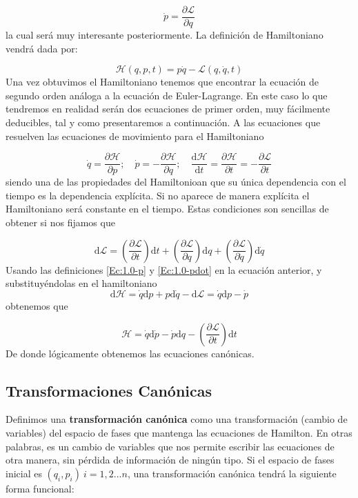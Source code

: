 \documentclass[12pt,a4paper]{article}
\numberwithin{equation}{section}
\numberwithin{figure}{section}
\newcommand{\parentesis}[1]{\left( #1  \right)}
\newcommand{\parciales}[2]{\frac{\partial #1}{\partial #2}}
\newcommand{\pparciales}[2]{\parentesis{\parciales{#1}{#2}}}
\newcommand{\D}{\mathrm{d}}
\newcommand{\derivadas}[2]{\frac{\D #1}{\D #2}}
\newcommand{\Lcal}{\mathcal{L}}
\newcommand{\Hcal}{\mathcal{H}}
\begin{document}
\begin{equation}
\dot{p} = \parciales{\Lcal}{q}  \label{Ec:1.0-pdot}
\end{equation}
la cual será muy interesante posteriormente. La definición de Hamiltoniano vendrá dada por:

\begin{equation}
\Hcal(q,p,t) = p \dot{q} - \Lcal(q,\dot{q},t)
\end{equation}
Una vez obtuvimos el Hamiltoniano tenemos que encontrar la ecuación de segundo orden análoga a la ecuación de Euler-Lagrange. En este caso lo que tendremos en realidad serán dos ecuaciones de primer orden, muy fácilmente deducibles, tal y como presentaremos a continuación. A las ecuaciones que resuelven las ecuaciones de movimiento para el Hamiltoniano

\begin{equation}
\dot{q} = \parciales{\Hcal}{p}; \quad \dot{p} = - \parciales{\Hcal}{q}; \quad 
\derivadas{\Hcal}{t} = \parciales{\Hcal}{t} = - \parciales{\Lcal}{t}
\end{equation}
siendo una de las propiedades del Hamiltonioan que su única dependencia con el tiempo es la dependencia explícita. Si no aparece de manera explícita el Hamiltoniano será constante en el tiempo. Estas condiciones son sencillas de obtener si nos fijamos que

\begin{equation}
\D \Lcal = \pparciales{\Lcal}{t} \D t +  \pparciales{\Lcal}{q} \D q +  \pparciales{\Lcal}{\dot{q}} \D \dot{q}
\end{equation}
Usando las definiciones \ref{Ec:1.0-p} y \ref{Ec:1.0-pdot} en la ecuación anterior, y substituyéndolas en el hamiltoniano
$$
\D \Hcal = \dot{q} \D p + p  \D \dot{q} - \D \Lcal = \dot{q} \D p - \dot{p} 
$$
obtenemos que

\begin{equation}
\Hcal = \dot{q} \D \dot p - \dot{p} \D q  - \pparciales{\Lcal}{t} \D t
\end{equation}
De donde lógicamente obtenemos las ecuaciones canónicas. 

\subsection{Transformaciones Canónicas}

Definimos una \textbf{transformación canónica} como una transformación (cambio de variables) del espacio de fases que mantenga las ecuaciones de Hamilton. En otras palabras, es un cambio de variables que nos permite escribir las ecuaciones de otra manera, sin pérdida de información de ningún tipo. Si el espacio de fases inicial es $(q_i,p_i) \ i = 1,2...n$, una transformación canónica tendrá la siguiente forma funcional:
\end{document}
